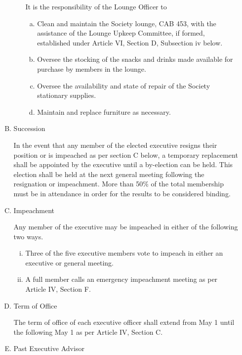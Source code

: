 \documentclass[11pt]{article}
\begin{document}
\begin{enumerate}[I.]
\begin{enumerate}[A)]
\begin{enumerate}[i)]
          It is the responsibility of the Lounge Officer to
            \begin{enumerate}[a)]
              \item Clean and maintain the Society lounge, CAB 453, with the
                assistance of the Lounge Upkeep Committee, if formed,
                established under Article VI, Section D, Subsection iv below.
              \item Oversee the stocking of the snacks and drinks made
                available for purchase by members in the lounge.
              \item Oversee the availability and state of repair of the
                Society stationary supplies.
              \item Maintain and replace furniture as necessary.
            \end{enumerate}
        \end{enumerate}
        \item Succession

        In the event that any member of the elected executive resigns their
        position or is impeached as per section C below, a temporary
        replacement shall be appointed by the executive until a by-election
        can be held. This election shall be held at the next general meeting
        following the resignation or impeachment. More than 50\% of the total
        membership must be in attendance in order for the results to be
        considered binding.
        \item Impeachment

        Any member of the executive may be impeached in either of the
        following two ways.
          \begin{enumerate}[i)]
            \item Three of the five executive members vote to impeach in
              either
              an executive or general meeting.
            \item A full member calls an emergency impeachment meeting as per
              Article IV, Section F.
          \end{enumerate}
        \item Term of Office

        The term of office of each executive officer shall extend from May 1
        until the following May 1 as per Article IV, Section C.

        \item Past Executive Advisor


\end{enumerate}
\end{enumerate}
\end{document}
